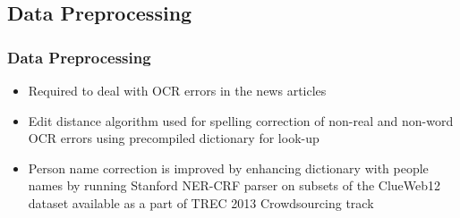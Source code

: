 \documentclass{beamer}
\begin{document}
\subsection{Data Preprocessing}

\begin{frame}
\frametitle{Data Preprocessing}
\begin{itemize}
\item
Required to deal with OCR errors in the news articles
\item
Edit distance algorithm used for spelling correction of non-real and non-word OCR errors using precompiled dictionary for look-up
\item
Person name correction is improved by enhancing dictionary with people names by running Stanford NER-CRF parser on subsets of the ClueWeb12 dataset available as a part of TREC 2013 Crowdsourcing track
\end{itemize}
\end{frame}
\end{document}
